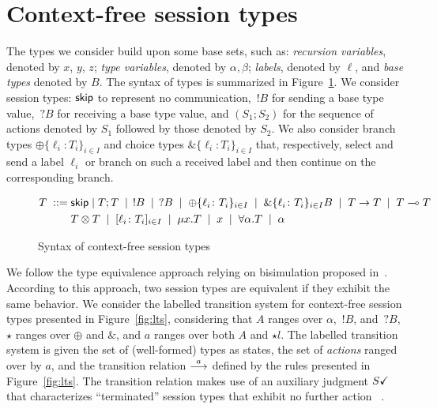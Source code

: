\section{Context-free session types}
\label{sec:contextfreesession}

The types we consider build upon some base sets, such as: {\it recursion variables}, denoted by $x$, $y$, $z$; {\it type variables}, denoted by $\alpha, \beta$; {\it labels}, denoted by $\ell$, and {\it base types} denoted by $B$. The syntax of types is summarized in Figure~\ref{fig:types}. We consider session types: $\mathsf{skip}$ to represent no communication, $\,!B$ for sending a base type value, $\,?B$ for receiving a base type value, and $(S_1;S_2)$ for the sequence of actions denoted by $S_1$ followed by those denoted by $S_2$. We also consider branch types $\oplus\{\ell_i\colon T_i\}_{i\in I}$ and choice types $\&\{\ell_i\colon T_i\}_{i\in I}$ that, respectively, select and send a label $\ell_i$ or branch on such a received label and then continue on the corresponding branch. 

\begin{figure}[h!]
\vspace*{-4mm}
  \begin{align*}
    T \; ::= \;& \mathsf{skip} \mid T;T \;\mid\; \,!B \;\mid\; \,?B \;\mid\; 
     \oplus\{\ell_i\colon T_i\}_{i\in I} \;\mid\; \&\{\ell_i\colon T_i\}_{i\in I} B \;\mid\; T\to T \;\mid\; T\multimap T\\
    & T \otimes T \;\mid\; [\ell_i\colon T_i]_{i\in I} \;\mid\; \mu x.T \;\mid\; x \;\mid\; \forall\alpha.T  \;\mid\; \alpha 
  \end{align*}
  \vspace*{-4mm}
  \caption{Syntax of context-free session types}
  \label{fig:types}
\end{figure}

We follow the type equivalence approach relying on bisimulation proposed in~\cite{thiemann2016context}. According to this approach, two session types are equivalent if they exhibit the same behavior. We consider the labelled transition system for context-free session types presented in Figure~\ref{fig:lts}, considering that $A$ ranges over $\alpha$, $\,!B$, and $\,?B$, $\star$ ranges over
$\oplus$ and $\&$, and $a$ ranges over both $A$ and $\star l$. 
The labelled transition system is given the set of (well-formed) types
 as states, the set of \emph{actions} ranged over by $a$, and
the transition relation $\stackrel{a}{\longrightarrow}$ defined by the rules presented in
Figure~\ref{fig:lts}. The transition relation 
makes use of an auxiliary judgment $S \checkmark$ that characterizes
``terminated'' session types that exhibit no further action~\cite{DBLP:journals/jacm/AcetoH92} . 

